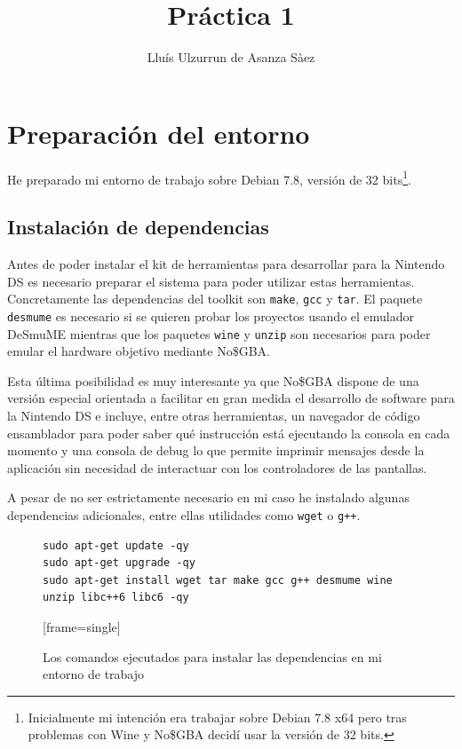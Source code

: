 \documentclass[12pt,english]{article}
\title{Práctica 1}
\author{Lluís Ulzurrun de Asanza Sàez}
\date{}
\begin{document}
    \maketitle
    
    \tableofcontents
    
    \newpage
        
    \section{Preparación del entorno}
    
    He preparado mi entorno de trabajo sobre Debian 7.8, versión de 32 bits\footnote{Inicialmente mi intención era trabajar sobre Debian 7.8 x64 pero tras problemas con Wine y No\$GBA decidí usar la versión de 32 bits.}.
        
	\subsection{Instalación de dependencias}
	
	Antes de poder instalar el kit de herramientas para desarrollar para la Nintendo DS es necesario preparar el sistema para poder utilizar estas herramientas. Concretamente las dependencias del toolkit son {\tt make}, {\tt gcc} y {\tt tar}. El paquete {\tt desmume} es necesario si se quieren probar los proyectos usando el emulador  DeSmuME mientras que los paquetes {\tt wine} y {\tt unzip} son necesarios para poder emular el hardware objetivo mediante No\$GBA.
	
	Esta última posibilidad es muy interesante ya que No\$GBA dispone de una versión especial orientada a facilitar en gran medida el desarrollo de software para la Nintendo DS e incluye, entre otras herramientas, un navegador de código ensamblador para poder saber qué instrucción está ejecutando la consola en cada momento y una consola de debug lo que permite imprimir mensajes desde la aplicación sin necesidad de interactuar con los controladores de las pantallas.
	
	A pesar de no ser estrictamente necesario en mi caso he instalado algunas dependencias adicionales, entre ellas utilidades como {\tt wget} o {\tt g++}.
	
\begin{figure}[ht]
\begin{verbatim}
sudo apt-get update -qy
sudo apt-get upgrade -qy
sudo apt-get install wget tar make gcc g++ desmume wine unzip libc++6 libc6 -qy
\end{verbatim}[frame=single]
	\caption{Los comandos ejecutados para instalar las dependencias en mi entorno de trabajo}
	\label{fig:installDependencies}
\end{figure}
	
\end{document}
